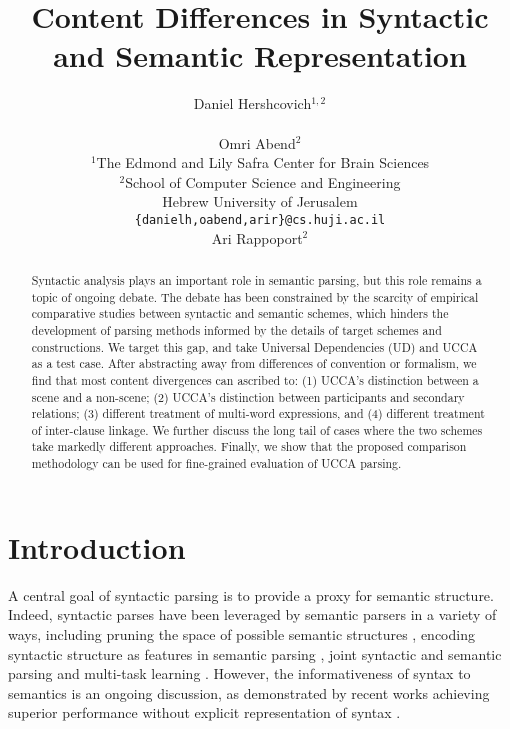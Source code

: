 \documentclass[11pt,a4paper]{article}
\title{Content Differences in Syntactic and Semantic Representation}
\author{Daniel Hershcovich$^{1,2}$ \\
  \\\And
  Omri Abend$^2$ \\
  $^1$The Edmond and Lily Safra Center for Brain Sciences \\
  $^2$School of Computer Science and Engineering \\
  Hebrew University of Jerusalem \\
  \texttt{\{danielh,oabend,arir\}@cs.huji.ac.il}
  \\\And
  Ari Rappoport$^2$
}
\date{}
\begin{document}
\maketitle

\begin{abstract}

  Syntactic analysis plays an important role in semantic parsing,
  but this role remains a topic of ongoing debate.
  The debate has been constrained by the scarcity of empirical comparative studies between syntactic and semantic schemes,
  which hinders the development of parsing methods informed by the details of target schemes and constructions.
  We target this gap, and take Universal Dependencies (UD) and UCCA as a test case.
  After abstracting away from differences of convention or formalism,
  we find that most content divergences can ascribed to: 
  (1) UCCA's distinction between a scene and a non-scene; %
  (2) UCCA's distinction between participants and secondary relations; %
  (3) different treatment of multi-word expressions, and
  (4) different treatment of inter-clause linkage.
  We further discuss the long tail of cases where the two schemes take markedly
  different approaches.
  Finally, we show that the proposed comparison methodology can be used
  for fine-grained evaluation of UCCA parsing.
\end{abstract}


\section{Introduction}\label{sec:introduction}

  A central goal of syntactic parsing is to provide a proxy for semantic structure.
  Indeed, syntactic parses have been leveraged by semantic parsers in a variety of ways,
  including pruning the space of possible semantic structures \cite{xue2004calibrating}, 
  encoding syntactic structure as features in semantic parsing \cite{gildea2002automatic,N15-1007,E17-1045}, 
  joint syntactic and semantic parsing \cite{surdeanu2008conll,hajivc2009conll} and
  multi-task learning \cite{strubell2018linguistically,swayamdipta2018syntactic}.
  However, the informativeness of syntax to semantics is an ongoing discussion,
  as demonstrated by recent works achieving superior performance without explicit representation of syntax
  \cite{Peng-EtAl:2018:NAACL,P18-2077,P18-1192}.
  
\end{document}
